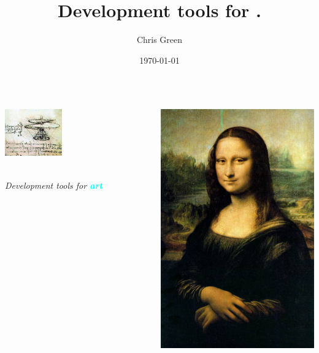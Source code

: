 \documentclass[xcolor={dvipsnames,table},c,compress,colorlinks]{beamer}
\title{Development tools for \art.}
\author[Green]{Chris Green}
\institute[Fermilab]{SCD-ADSS-SSI}
\date[]{\today}
\newcommand{\productname}[1]{\textbf{\textcolor{cyan}{#1}}\xspace}
\newcommand{\art}{\productname{art}}
\begin{document}
\begin{frame}
  \color{structure}
  \begin{columns}[onlytextwidth,b]
    \begin{column}{0.7\textwidth}
      \parbox[t][][c]{\textwidth}{\hspace{.5in}\includegraphics[width=0.4\textwidth]{flyingmachine_l}}
      \\ \vspace{.3in}
      \Huge\textit{Development tools for \art}
    \end{column}
    \begin{column}{0.3\textwidth}
      \hfill
      \mbox{\includegraphics{monalisa_full}}

\end{column}
\end{columns}
\end{frame}
\end{document}
